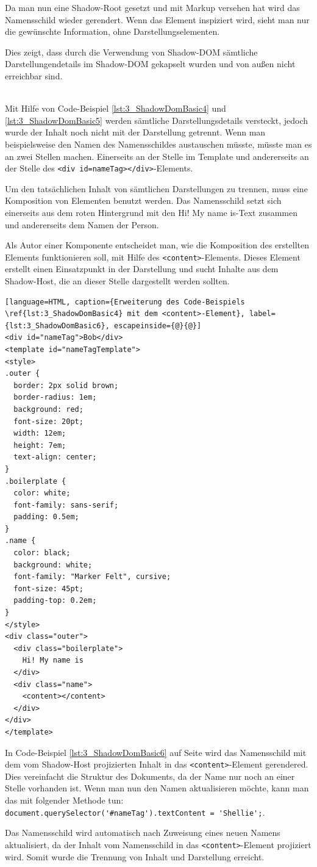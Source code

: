 \begin{enumerate}
Da man nun eine Shadow-Root gesetzt und mit Markup versehen hat wird das Namensschild wieder gerendert. Wenn das Element inspiziert wird, sieht man nur die gewünschte Information, ohne Darstellungselementen.

Dies zeigt, dass durch die Verwendung von Shadow-DOM sämtliche Darstellungendetails im Shadow-DOM gekapselt wurden und von außen nicht erreichbar sind.

 \hfill \\
Mit Hilfe von Code-Beispiel \ref{lst:3_ShadowDomBasic4} und \ref{lst:3_ShadowDomBasic5} werden sämtliche Darstellungsdetails versteckt, jedoch wurde der Inhalt noch nicht mit der Darstellung getrennt. Wenn man beispielsweise den Namen des Namensschildes austauschen müsste, müsste man es an zwei Stellen machen. Einerseits an der Stelle im Template und andererseits an der Stelle des \lstinline|<div id=nameTag></div>|-Elements.

Um den tatsächlichen Inhalt von sämtlichen Darstellungen zu trennen, muss eine Komposition von Elementen benutzt werden. Das Namensschild setzt sich einerseits aus dem roten Hintergrund mit den \glqq Hi! My name is\grqq -Text zusammen und andererseits dem Namen der Person.

Als Autor einer Komponente entscheidet man, wie die Komposition des erstellten Elements funktionieren soll, mit Hilfe des \lstinline|<content>|-Elements. Dieses Element erstellt einen Einsatzpunkt in der Darstellung und sucht Inhalte aus dem Shadow-Host, die an dieser Stelle dargestellt werden sollten.

\begin{lstlisting}[language=HTML, caption={Erweiterung des Code-Beispiels \ref{lst:3_ShadowDomBasic4} mit dem <content>-Element}, label={lst:3_ShadowDomBasic6}, escapeinside={@}{@}]
<div id="nameTag">Bob</div>
<template id="nameTagTemplate">
<style>
.outer {
  border: 2px solid brown;
  border-radius: 1em;
  background: red;
  font-size: 20pt;
  width: 12em;
  height: 7em;
  text-align: center;
}
.boilerplate {
  color: white;
  font-family: sans-serif;
  padding: 0.5em;
}
.name {
  color: black;
  background: white;
  font-family: "Marker Felt", cursive;
  font-size: 45pt;
  padding-top: 0.2em;
}
</style>
<div class="outer">
  <div class="boilerplate">
    Hi! My name is
  </div>
  <div class="name">
    <content></content>
  </div>
</div>
</template>
\end{lstlisting}

In Code-Beispiel \ref{lst:3_ShadowDomBasic6} auf Seite \pageref{lst:3_ShadowDomBasic6} wird das Namensschild mit dem vom Shadow-Host projizierten Inhalt in das \lstinline|<content>|-Element gerendered.
Dies vereinfacht die Struktur des Dokuments, da der Name nur noch an einer Stelle vorhanden ist. Wenn man nun den Namen aktualisieren möchte, kann man das mit folgender Methode tun: \lstinline|document.querySelector('#nameTag').textContent = 'Shellie';|.

Das Namensschild wird automatisch nach Zuweisung eines neuen Namens aktualisiert, da der Inhalt vom Namensschild in das \lstinline|<content>|-Element projiziert wird. Somit wurde die Trennung von Inhalt und Darstellung erreicht.
\end{enumerate}